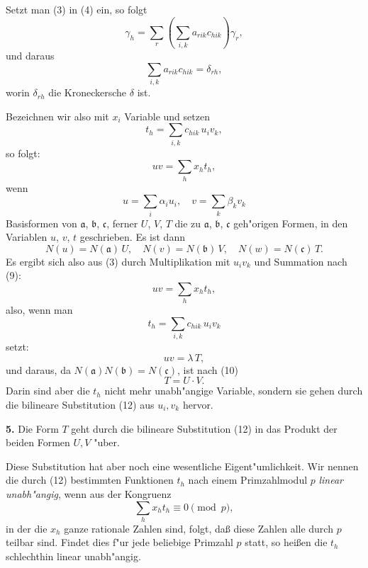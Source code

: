 \documentclass[12pt,a4paper]{article}
\theoremstyle{plain}
\begin{document}
Setzt man (3) in (4) ein, so folgt
\begin{equation}
\gamma_h = \sum_{r} \left(\sum_{i,k} a_{rik}c_{hik}\right)\gamma_r,
\end{equation}
und daraus
\begin{equation}
\sum_{i,k} a_{rik}c_{hik} = \delta_{rh},
\tag{6}
\end{equation}
worin $\delta_{rh}$ die Kroneckersche $\delta$ ist.

Bezeichnen wir also mit $x_i$ Variable und setzen
\begin{equation}
t_h = \sum_{i,k} c_{hik}\,u_i v_k,
\tag{7}
\end{equation}
so folgt:
\begin{equation}
uv = \sum_{h} x_h t_h,
\tag{8}
\end{equation}
wenn
\begin{equation}
u = \sum_i \alpha_i u_i,\quad v = \sum_k \beta_k v_k
\tag{9}
\end{equation}
Basisformen von $\mathfrak{a}$, $\mathfrak{b}$, $\mathfrak{c}$, ferner $U$, $V$, $T$ die zu $\mathfrak{a}$, $\mathfrak{b}$, $\mathfrak{c}$ geh"origen Formen, in den Variablen $u$, $v$, $t$ geschrieben. Es ist dann
\begin{equation}
N(u) = N(\mathfrak{a})\,U,\quad N(v) = N(\mathfrak{b})\,V,\quad N(w) = N(\mathfrak{c})\,T.
\tag{10}
\end{equation}
Es ergibt sich also aus (3) durch Multiplikation mit $u_i v_k$ und Summation nach (9):
\begin{equation}
uv = \sum_h x_h t_h,
\tag{11}
\end{equation}
also, wenn man
\begin{equation}
t_h = \sum_{i,k} c_{hik}\,u_i v_k
\tag{12}
\end{equation}
setzt:
\begin{equation}
uv = \lambda\,T,
\tag{13}
\end{equation}
und daraus, da $N(\mathfrak{a})N(\mathfrak{b}) = N(\mathfrak{c})$, ist nach (10)
\begin{equation}
T = U \cdot V.
\tag{14}
\end{equation}
Darin sind aber die $t_h$ nicht mehr unabh"angige Variable, sondern sie gehen durch die bilineare Substitution (12) aus $u_i, v_k$ hervor.

\textbf{5.} Die Form $T$ geht durch die bilineare Substitution (12) in das Produkt der beiden Formen $U, V$ "uber.

Diese Substitution hat aber noch eine wesentliche Eigent"umlichkeit. Wir nennen die durch (12) bestimmten Funktionen $t_h$ nach einem Primzahlmodul $p$ \textit{linear unabh"angig}, wenn aus der Kongruenz
\begin{equation}
\sum_{h} x_h t_h \equiv 0 \pmod{p},
\tag{15}
\end{equation}
in der die $x_h$ ganze rationale Zahlen sind, folgt, da\ss{} diese Zahlen alle durch $p$ teilbar sind. Findet dies f"ur jede beliebige Primzahl $p$ statt, so hei\ss en die $t_h$ schlechthin linear unabh"angig.
\end{document}
